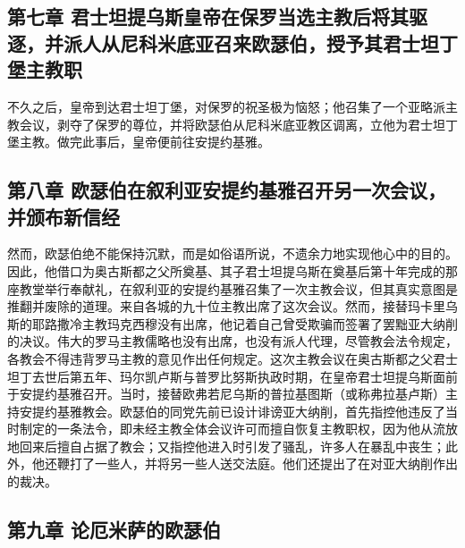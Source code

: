 
\subsection{第七章 君士坦提乌斯皇帝在保罗当选主教后将其驱逐，并派人从尼科米底亚召来欧瑟伯，授予其君士坦丁堡主教职}

不久之后，皇帝到达君士坦丁堡，对保罗的祝圣极为恼怒；他召集了一个亚略派主教会议，剥夺了保罗的尊位，并将欧瑟伯从尼科米底亚教区调离，立他为君士坦丁堡主教。做完此事后，皇帝便前往安提约基雅。\par


\subsection{第八章 欧瑟伯在叙利亚安提约基雅召开另一次会议，并颁布新信经}

然而，欧瑟伯绝不能保持沉默，而是如俗语所说，不遗余力地实现他心中的目的。因此，他借口为奥古斯都之父所奠基、其子君士坦提乌斯在奠基后第十年完成的那座教堂举行奉献礼，在叙利亚的安提约基雅召集了一次主教会议，但其真实意图是推翻并废除的道理。来自各城的九十位主教出席了这次会议。然而，接替玛卡里乌斯的耶路撒冷主教玛克西穆没有出席，他记着自己曾受欺骗而签署了罢黜亚大纳削的决议。伟大的罗马主教儒略也没有出席，也没有派人代理，尽管教会法令规定，各教会不得违背罗马主教的意见作出任何规定。这次主教会议在奥古斯都之父君士坦丁去世后第五年、玛尔凯卢斯与普罗比努斯执政时期，在皇帝君士坦提乌斯面前于安提约基雅召开。当时，接替欧弗若尼乌斯的普拉基图斯（或称弗拉基卢斯）主持安提约基雅教会。欧瑟伯的同党先前已设计诽谤亚大纳削，首先指控他违反了当时制定的一条法令，即未经主教全体会议许可而擅自恢复主教职权，因为他从流放地回来后擅自占据了教会；又指控他进入时引发了骚乱，许多人在暴乱中丧生；此外，他还鞭打了一些人，并将另一些人送交法庭。他们还提出了在对亚大纳削作出的裁决。\par


\subsection{第九章 论厄米萨的欧瑟伯}

